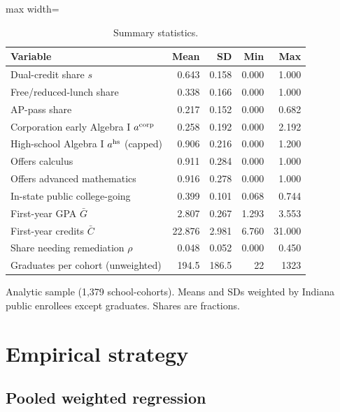 \documentclass[aps,prd,reprint,superscriptaddress,nofootinbib,floatfix]{revtex4-2}
\begin{document}
\begin{table}[t]
\caption{Summary statistics.}
\label{tab:desc}
\footnotesize
\begin{adjustbox}{max width=\linewidth}
\begin{tabular}{lrrrr}
\hline\hline
Variable & Mean & SD & Min & Max \\
\hline
Dual-credit share $s$ & 0.643 & 0.158 & 0.000 & 1.000 \\
Free/reduced-lunch share & 0.338 & 0.166 & 0.000 & 1.000 \\
AP-pass share & 0.217 & 0.152 & 0.000 & 0.682 \\
Corporation early Algebra I $a^{\rm corp}$ & 0.258 & 0.192 & 0.000 & 2.192 \\
High-school Algebra I $a^{\rm hs}$ (capped) & 0.906 & 0.216 & 0.000 & 1.200 \\
Offers calculus & 0.911 & 0.284 & 0.000 & 1.000 \\
Offers advanced mathematics & 0.916 & 0.278 & 0.000 & 1.000 \\
In-state public college-going & 0.399 & 0.101 & 0.068 & 0.744 \\
First-year GPA $\bar G$ & 2.807 & 0.267 & 1.293 & 3.553 \\
First-year credits $\bar C$ & 22.876 & 2.981 & 6.760 & 31.000 \\
Share needing remediation $\rho$ & 0.048 & 0.052 & 0.000 & 0.450 \\
Graduates per cohort (unweighted) & 194.5 & 186.5 & 22 & 1323 \\
\hline\hline
\end{tabular}
\end{adjustbox}
\par\smallskip\parbox{0.98\linewidth}{\scriptsize Analytic sample (1,379 school-cohorts). Means and SDs weighted by Indiana public enrollees except graduates. Shares are fractions.}
\end{table}

\section{Empirical strategy}\label{sec:methods}

\subsection{Pooled weighted regression}
\end{document}
